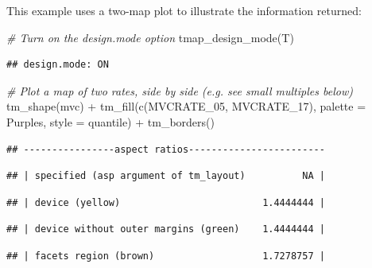 \documentclass[
]{book}
\newenvironment{Shaded}{\begin{snugshade}}{\end{snugshade}}
\newcommand{\AttributeTok}[1]{\textcolor[rgb]{0.77,0.63,0.00}{#1}}
\newcommand{\CommentTok}[1]{\textcolor[rgb]{0.56,0.35,0.01}{\textit{#1}}}
\newcommand{\FunctionTok}[1]{\textcolor[rgb]{0.00,0.00,0.00}{#1}}
\newcommand{\NormalTok}[1]{#1}
\newcommand{\SpecialCharTok}[1]{\textcolor[rgb]{0.00,0.00,0.00}{#1}}
\newcommand{\StringTok}[1]{\textcolor[rgb]{0.31,0.60,0.02}{#1}}
\begin{document}
This example uses a two-map plot to illustrate the information returned:

\begin{Shaded}
\begin{Highlighting}[]
\CommentTok{\# Turn \textquotesingle{}on\textquotesingle{} the design.mode option}
\FunctionTok{tmap\_design\_mode}\NormalTok{(T)}
\end{Highlighting}
\end{Shaded}

\begin{verbatim}
## design.mode: ON
\end{verbatim}

\begin{Shaded}
\begin{Highlighting}[]
\CommentTok{\# Plot a map of two rates, side by side (e.g. see small multiples below)}
\FunctionTok{tm\_shape}\NormalTok{(mvc) }\SpecialCharTok{+} 
  \FunctionTok{tm\_fill}\NormalTok{(}\FunctionTok{c}\NormalTok{(}\StringTok{\textquotesingle{}MVCRATE\_05\textquotesingle{}}\NormalTok{, }\StringTok{\textquotesingle{}MVCRATE\_17\textquotesingle{}}\NormalTok{),}
          \AttributeTok{palette =} \StringTok{\textquotesingle{}Purples\textquotesingle{}}\NormalTok{,}
          \AttributeTok{style =} \StringTok{\textquotesingle{}quantile\textquotesingle{}}\NormalTok{) }\SpecialCharTok{+}
\FunctionTok{tm\_borders}\NormalTok{()}
\end{Highlighting}
\end{Shaded}

\begin{verbatim}
## ----------------aspect ratios------------------------
\end{verbatim}

\begin{verbatim}
## | specified (asp argument of tm_layout)          NA |
\end{verbatim}

\begin{verbatim}
## | device (yellow)                         1.4444444 |
\end{verbatim}

\begin{verbatim}
## | device without outer margins (green)    1.4444444 |
\end{verbatim}

\begin{verbatim}
## | facets region (brown)                   1.7278757 |
\end{verbatim}
\end{document}
